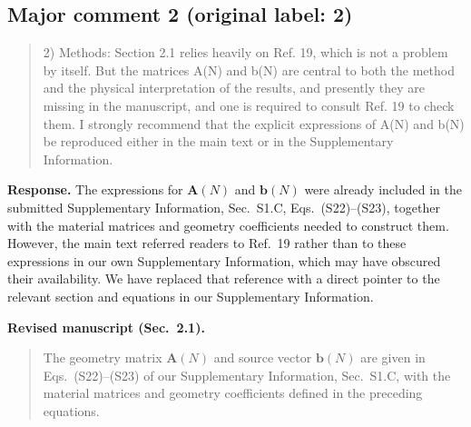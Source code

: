 \documentclass[11pt,a4paper]{article}
\newif\ifshowrevisions
\newcommand{\revised}[1]{{\ifshowrevisions\color{revisionblue}\fi #1}}
\newcommand{\reviewercomment}[1]{\begin{quote}\small #1\end{quote}}
\newcommand{\response}[1]{\par\textbf{Response.} #1\par}
\newcommand{\manuscripttext}[2]{\par\textbf{Revised manuscript (#1).}\begin{quote}\revised{#2}\end{quote}}
\begin{document}
\subsection*{Major comment 2 (original label: 2)}
\label{r1-major-2}
\reviewercomment{
2) Methods: Section 2.1 relies heavily on Ref. 19, which is not a problem by itself. But the matrices A(N) and b(N) are central to both the method and the physical interpretation of the results, and presently they are missing in the manuscript, and one is required to consult Ref. 19 to check them. I strongly recommend that the explicit expressions of A(N) and b(N) be reproduced either in the main text or in the Supplementary Information.
}
\response{The expressions for $\mathbf A(N)$ and $\mathbf b(N)$ were already included in the submitted Supplementary Information, Sec.~S1.C, Eqs.~(S22)--(S23), together with the material matrices and geometry coefficients needed to construct them. However, the main text referred readers to Ref.~19 rather than to these expressions in our own Supplementary Information, which may have obscured their availability. We have replaced that reference with a direct pointer to the relevant section and equations in our Supplementary Information.}
\manuscripttext{Sec.~2.1}{The geometry matrix $\mathbf A(N)$ and source vector $\mathbf b(N)$ are given in Eqs.~(S22)--(S23) of our Supplementary Information, Sec.~S1.C, with the material matrices and geometry coefficients defined in the preceding equations.}
\end{document}
